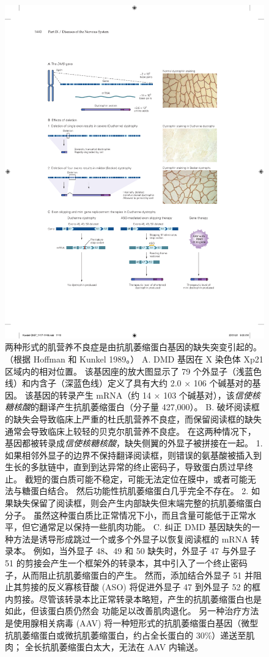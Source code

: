 \begin{figure}[htbp]
	\centering
	\includegraphics[width=0.9\linewidth]{chap57/fig_57_10}
	\caption{两种形式的肌营养不良症是由抗肌萎缩蛋白基因的缺失突变引起的。 （根据 Hoffman 和 Kunkel 1989。） A. DMD 基因在 X 染色体 Xp21 区域内的相对位置。 该基因座的放大图显示了 79 个外显子（浅蓝色线）和内含子（深蓝色线）定义了具有大约 2.0 × 106 个碱基对的基因。 该基因的转录产生 mRNA（约 14 × 103 个碱基对），该\textit{信使核糖核酸}的翻译产生抗肌萎缩蛋白（分子量 427,000）。 B. 破坏阅读框的缺失会导致临床上严重的杜氏肌营养不良症，而保留阅读框的缺失通常会导致临床上较轻的贝克尔肌营养不良症。 在这两种情况下，基因都被转录成\textit{信使核糖核酸}，缺失侧翼的外显子被拼接在一起。 1. 如果相邻外显子的边界不保持翻译阅读框，则错误的氨基酸被插入到生长的多肽链中，直到到达异常的终止密码子，导致蛋白质过早终止。 截短的蛋白质可能不稳定，可能无法定位在膜中，或者可能无法与糖蛋白结合。 然后功能性抗肌萎缩蛋白几乎完全不存在。 2. 如果缺失保留了阅读框，则会产生内部缺失但末端完整的抗肌萎缩蛋白分子。 虽然这种蛋白质比正常情况下小，而且含量可能低于正常水平，但它通常足以保持一些肌肉功能。 C. 纠正 DMD 基因缺失的一种方法是诱导形成跳过一个或多个外显子以恢复阅读框的 mRNA 转录本。 例如，当外显子 48、49 和 50 缺失时，外显子 47 与外显子 51 的剪接会产生一个框架外的转录本，其中引入了一个终止密码子，从而阻止抗肌萎缩蛋白的产生。 然而，添加结合外显子 51 并阻止其剪接的反义寡核苷酸 (ASO) 将促进外显子 47 到外显子 52 的框内剪接。尽管该转录本比正常转录本略短，产生的抗肌萎缩蛋白也是如此，但该蛋白质仍然会 功能足以改善肌肉退化。 另一种治疗方法是使用腺相关病毒 (AAV) 将一种短形式的抗肌萎缩蛋白基因（微型抗肌萎缩蛋白或微抗肌萎缩蛋白，约占全长蛋白的 30\%）递送至肌肉； 全长抗肌萎缩蛋白太大，无法在 AAV 内输送。}
	\label{fig:57_10}
\end{figure}


